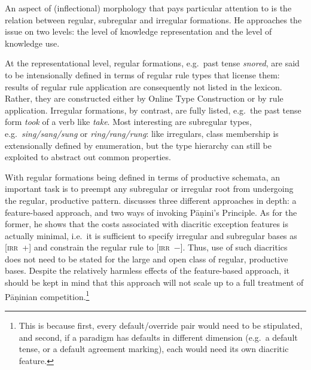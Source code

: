 \documentclass[output=paper
 	        ,biblatex
                ,babelshorthands
                ,newtxmath
                ,draftmode
                ,colorlinks, citecolor=brown
]{langscibook}
\newcommand{\mathplus}{{\normalfont +}}
\begin{document}
\begin{exe}
\begin{xlist}
An aspect of (inflectional) morphology that \citet{Koenig99} pays
particular attention to is the relation between regular, subregular
and irregular formations. He approaches the issue on two levels: the
level of knowledge representation and the level of knowledge use. 

At the representational level, regular formations, e.g.\ past tense
\textit{snored}, are said to be intensionally defined in terms of
regular rule types that license them: results of regular rule
application are consequently not listed in the lexicon. Rather, they are
constructed either by Online Type Construction or by rule application.
Irregular formations, by contrast, are fully listed, e.g.\ the past
tense form \textit{took} of a verb like \textit{take}. Most
interesting are subregular types, e.g.\ \textit{sing/sang/sung} or
\textit{ring/rang/rung}: like irregulars, class membership is
extensionally defined by enumeration, but the type hierarchy can still
be exploited to abstract out common properties.

With regular formations being defined in terms of productive schemata,
an important task is to preempt any subregular or irregular root from
undergoing the regular, productive pattern. \citet{Koenig99} discusses
three different approaches in depth: a feature-based approach, and two
ways of invoking Pāṇini's Principle. As for the former, he shows that
the costs associated with diacritic exception features is actually
minimal, i.e.\ it is sufficient to specify irregular and subregular
bases as \textsc{[irr~\mathplus{}]} and constrain the regular rule to
\textsc{[irr~$-$]}. Thus, use of such diacritics does not need to be
stated for the large and open class of regular, productive
bases. Despite the relatively harmless effects of the feature-based
approach, it should be kept in mind that this approach will not scale
up to a full treatment of Pāṇinian competition.\footnote{This is
  because first, every default/override pair would need to be
  stipulated, and second, if a paradigm has defaults in different
  dimension (e.g.\ a default tense, or a default agreement marking),
  each would need its own diacritic feature.}


\end{xlist}
\end{exe}
\end{document}
